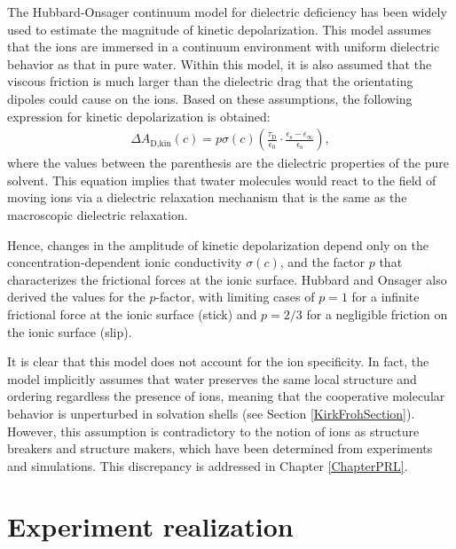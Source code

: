 The Hubbard-Onsager continuum model for dielectric deficiency\!\cite{Hubbard1977a,Hubbard1977,Hubbard1978c} has been widely used to estimate the magnitude of kinetic depolarization.\!\cite{Hall1981,Nortemann1997,Kaatze1997,Buchner1999,Buchner1999c,Chen2003,Tielrooij2009,Buchner2008,Ensing2013,Sega2014,Ottosson2014c} This model assumes that the ions are immersed in a continuum environment with uniform dielectric behavior as that in pure water. Within this model, it is also assumed that the viscous friction is much larger than the dielectric drag that the orientating dipoles could cause on the ions. Based on these assumptions, the following expression for kinetic depolarization is obtained:
\begin{eqnarray}
\Delta A_{\text{D,kin}} (c) = p \sigma (c)  \left(  \frac{\tau_\text{D}}{\epsilon_0} \cdot    \frac{\epsilon_\text{s} - \epsilon_\infty}{\epsilon_\text{s}}     \right),
\label{HubOnsaKin}
\end{eqnarray}
\noindent where the values between the parenthesis are the dielectric properties of the pure solvent. This equation implies that twater molecules would react to the field of moving ions via a dielectric relaxation mechanism that is the same as the macroscopic dielectric relaxation. 



Hence, changes in the amplitude of kinetic depolarization depend only on the concentration-dependent ionic conductivity $\sigma (c)$, and the factor $p$ that characterizes the frictional forces at the ionic surface. Hubbard and Onsager also derived the values for the $p$-factor, with limiting cases of $p=1$ for a infinite frictional force at the ionic surface (stick) and $p=2/3$ for a negligible friction on the ionic surface (slip). 



It is clear that this model does not account for the ion specificity. In fact, the model implicitly assumes that water preserves the same local structure and ordering regardless the presence of ions, meaning that the cooperative molecular behavior is unperturbed in solvation shells (see Section \ref{KirkFrohSection}).  However, this assumption is contradictory to the notion of ions as structure breakers and structure makers, which have been determined from experiments and simulations.\!\cite{Marcus2009,Shattuck2016} This discrepancy is addressed in Chapter \ref{ChapterPRL}.



\section{Experiment realization}\label{ExperimentalDRS}


